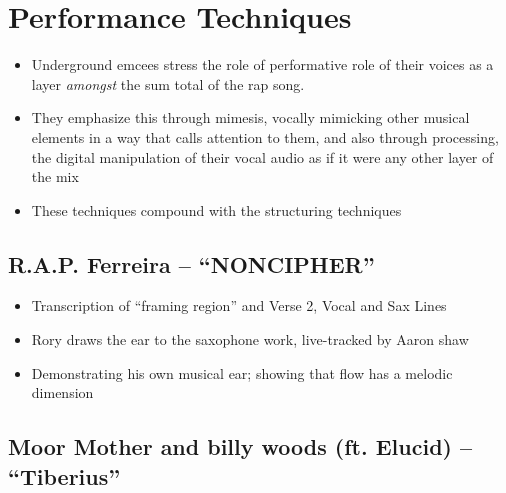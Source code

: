\section{Performance Techniques}
    \begin{itemize}
        \item Underground emcees stress the role of performative role of their voices as a layer
        \emph{amongst} the sum total of the rap song. 
        \item They emphasize this through mimesis, vocally mimicking other musical elements in a way
        that calls attention to them, and also through processing, the digital manipulation of their 
        vocal audio as if it were any other layer of the mix
        \item These techniques compound with the structuring techniques
    \end{itemize}

\subsection*{\centering R.A.P. Ferreira -- ``NONCIPHER''}
    \begin{itemize}
        \item Transcription of ``framing region'' and Verse 2, Vocal and Sax Lines
        \item Rory draws the ear to the saxophone work, live-tracked by Aaron shaw
        \item Demonstrating his own musical ear; showing that flow has a melodic dimension
    \end{itemize}
  
\subsection*{\centering Moor Mother and billy woods (ft. Elucid)  -- ``Tiberius''}
